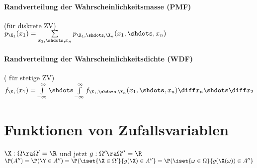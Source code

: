 \documentclass[german,color,6pt]{latex4ei/latex4ei_sheet}
\begin{document}
\begin{sectionbox}
	\paragraph{Randverteilung der Wahrscheinlichkeitsmasse (PMF)}
	(für diskrete ZV) \\
	$p_{\X_1}(x_1) = \sum\limits_{x_2,\shdots,x_n}{p_{\X_1,\shdots,\X_n}(x_1,\shdots,x_n)}$
	
	\paragraph{Randverteilung der Wahrscheinlichkeitsdichte (WDF)} ( für stetige ZV) \\
	$f_{\X_1}(x_1) = \int\limits_{-\infty}^{\infty}{\shdots\int\limits_{-\infty}^{\infty}{f_{\X_1,\shdots,\X_n}(x_1,\shdots,x_n)\diff x_n\shdots}\diff x_2}$
\end{sectionbox}



\section{Funktionen von Zufallsvariablen}
\begin{sectionbox}
	$\X: \Omega \ra \Omega' = \R$ und jetzt $g:\Omega' \ra \Omega'' = \R$\\
	$\P(A'') = \P(\Y \in A'') = \P(\iset{\X \in \Omega'}{g(\X) \in A''} = \P(\iset{\omega \in \Omega}{g(\X(\omega)) \in A''}$
\end{sectionbox}
\end{document}
